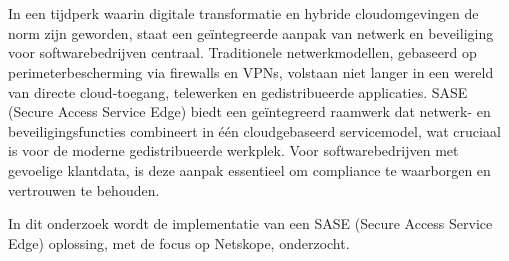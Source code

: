 
\chapter{}%
\label{ch:inleiding}



In een tijdperk waarin digitale transformatie en hybride cloudomgevingen de norm zijn geworden, staat een geïntegreerde aanpak van netwerk en beveiliging voor softwarebedrijven centraal. Traditionele netwerkmodellen, gebaseerd op perimeterbescherming via firewalls en VPNs, volstaan niet langer in een wereld van directe cloud-toegang, telewerken en gedistribueerde applicaties. SASE (Secure Access Service Edge) biedt een geïntegreerd raamwerk dat netwerk- en beveiligingsfuncties combineert in één cloudgebaseerd servicemodel, wat cruciaal is voor de moderne gedistribueerde werkplek. Voor softwarebedrijven met gevoelige klantdata, is deze aanpak essentieel om compliance te waarborgen en vertrouwen te behouden.

In dit onderzoek wordt de implementatie van een SASE (Secure Access Service Edge) oplossing, met de focus op Netskope, onderzocht.
\section{}%
\label{sec:probleemstelling}

